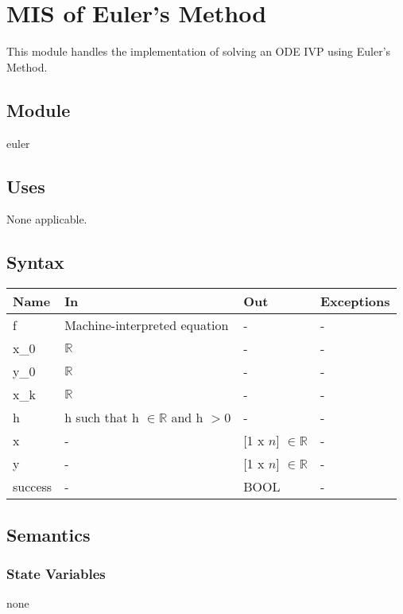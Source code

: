 \documentclass[12pt, titlepage]{article}
\begin{document}
\newpage


\section{MIS of Euler's Method} \label{modEuler}
This module handles the implementation of solving an ODE IVP using Euler's Method. 

\subsection{Module}
euler

\subsection{Uses}

None applicable.

\subsection{Syntax}

\begin{center}
\begin{tabular}{p{4cm} p{4cm} p{4cm} p{2cm}}
\hline
\textbf{Name} & \textbf{In} & \textbf{Out} & \textbf{Exceptions} \\
\hline
f & Machine-interpreted equation & - & -\\
x\_0 & $\mathbb{R}$ & - & -\\
y\_0 & $\mathbb{R}$ & - & -\\
x\_k & $\mathbb{R}$ & - & -\\
h & h such that h $\in \mathbb{R}$ and h $> 0$ & - & -\\
x & - & [1 x $n$] $\in \mathbb{R}$ & - \\
y & - & [1 x $n$] $\in \mathbb{R}$ & - \\
success & - & BOOL & - \\
\hline
\end{tabular}
\end{center}

\subsection{Semantics}

\subsubsection{State Variables}
none
\end{document}
